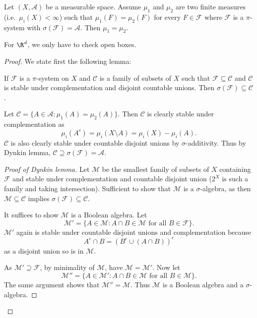 \documentclass[a4paper]{article}
\begin{document}
\begin{proposition}
  Let \((X, \mathcal A)\) be a measurable space. Assume \(\mu_1\) and \(\mu_2\) are two finite measures (i.e.\ \(\mu_i(X) < \infty\)) such that \(\mu_1(F) = \mu_2(F)\) for every \(F \in \mathcal F\) where \(\mathcal F\) is a \(\pi\)-system with \(\sigma(\mathcal F) = \mathcal A\). Then \(\mu_1 = \mu_2\).
\end{proposition}

For \(\R^d\), we only have to check open boxes.

\begin{proof}
We state first the following lemma:
\begin{lemma}
  If \(\mathcal F\) is a \(\pi\)-system on \(X\) and \(\mathcal C\) is a family of subsets of \(X\) such that \(\mathcal F \subseteq \mathcal C\) and \(\mathcal C\) is stable under complementation and disjoint countable unions. Then \(\sigma(\mathcal F) \subseteq \mathcal C\).
\end{lemma}

Let \(\mathcal C = \{A \in \mathcal A: \mu_1(A) = \mu_2(A)\}\). Then \(\mathcal C\) is clearly stable under complementation as
\[
  \mu_i (A^c) = \mu_i(X \setminus A) = \mu_i(X) - \mu_i(A).
\]
\(\mathcal C\) is also clearly stable under countable disjoint unions by \(\sigma\)-additivity. Thus by Dynkin lemma, \(\mathcal C \supseteq \sigma(\mathcal F) = \mathcal A\).

\begin{proof}[Proof of Dynkin lemma]
  Let \(\mathcal M\) be the smallest family of subsets of \(X\) containing \(\mathcal F\) and stable under complementation and countable disjoint union (\(2^X\) is such a family and taking intersection). Sufficient to show that \(\mathcal M\) is a \(\sigma\)-algebra, as then \(\mathcal M \subseteq \mathcal C\) implies \(\sigma(\mathcal F) \subseteq \mathcal C\).

  It suffices to show \(\mathcal M\) is a Boolean algebra. Let
  \[
    \mathcal M' = \{A \in \mathcal M: A \cap B \in \mathcal M \text{ for all } B \in \mathcal F\}.
  \]
  \(\mathcal M'\) again is stable under countable disjoint unions and complementation because
  \[
    A^c \cap B = (B^c \cup (A \cap B))^c
  \]
  as a disjoint union so is in \(\mathcal M\).

  As \(\mathcal M' \supseteq \mathcal F\), by minimality of \(\mathcal M\), have \(\mathcal M = \mathcal M'\). Now let
  \[
    \mathcal M'' = \{A \in \mathcal M': A \cap B \in \mathcal M \text{ for all } B \in \mathcal M\}.
  \]
  The same argument shows that \(\mathcal M'' = \mathcal M\). Thus \(\mathcal M\) is a Boolean algebra and a \(\sigma\)-algebra.
\end{proof}
\end{proof}
\end{document}
